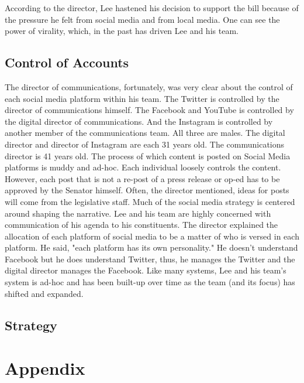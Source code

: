 \documentclass{article}
\begin{document}
\begin{flushleft}
According to the director, Lee hastened his decision to support the bill because of the pressure he felt from social media and from local media. One can see the power of virality, which, in the past has driven Lee and his team. 
\end{flushleft}

\subsection{Control of Accounts}
\begin{flushleft}
The director of communications, fortunately, was very clear about the control of each social media platform within his team. The Twitter is controlled by the director of communications himself. The Facebook and YouTube is controlled by the digital director of communications. And the Instagram is controlled by another member of the communications team. All three are males. The digital director and director of Instagram are each 31 years old. The communications director is 41 years old. The process of which content is posted on Social Media platforms is muddy and ad-hoc. Each individual loosely controls the content. However, each post that is not a re-post of a press release or op-ed has to be approved by the Senator himself. Often, the director mentioned, ideas for posts will come from the legislative staff. Much of the social media strategy is centered around shaping the narrative. Lee and his team are highly concerned with communication of his agenda to his constituents. The director explained the allocation of each platform of social media to be a matter of who is versed in each platform. He said, "each platform has its own personality." He doesn't understand Facebook but he does understand Twitter, thus, he manages the Twitter and the digital director manages the Facebook. Like many systems, Lee and his team's system is ad-hoc and has been built-up over time as the team (and its focus) has shifted and expanded. 
\end{flushleft}

\subsection{Strategy}
\begin{flushleft}
\end{flushleft}

\section{Appendix}
\end{document}

